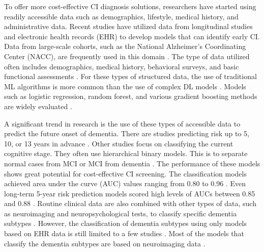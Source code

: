 To offer more cost-effective CI diagnosis solutions, researchers have started using readily accessible data such as demographics, lifestyle, medical history, and administrative data. Recent studies have utilized data from longitudinal studies and electronic health records (\acrshort{EHR}) to develop models that can identify early CI. Data from large-scale cohorts, such as the National Alzheimer's Coordinating Center (\acrshort{NACC}), are frequently used in this domain \cite{abbas2024Explainable, Ren2023Improving}. The type of data utilized often includes demographics, medical history, behavioral surveys, and basic functional assessments \cite{Ren2023Improving, Ren2025Identifying}. For these types of structured data, the use of traditional ML algorithms is more common than the use of complex DL models \cite{Zhu2020Machine}. Models such as logistic regression, random forest, and various gradient boosting methods are widely evaluated \cite{Akter2025Using, Cui2024Prediction, Georgiev2024Predicting}.

A significant trend in research is the use of these types of accessible data to predict the future onset of dementia. There are studies predicting risk up to 5, 10, or 13 years in advance \cite{Georgiev2024Predicting, Li2023Early}. Other studies focus on classifying the current cognitive stage. They often use hierarchical binary models. This is to separate normal cases from MCI or MCI from dementia \cite{Ren2023Improving, Yue2023Explainable}. The performance of these models shows great potential for cost-effective CI screening. The classification models achieved area under the curve (\acrshort{AUC}) values ranging from 0.80 to 0.96 \cite{Cui2024Prediction, Richter2025Cognitive}. Even long-term 5-year risk prediction models scored high levels of AUCs between 0.85 and 0.88 \cite{Georgiev2024Predicting, Li2023Early}. Routine clinical data are also combined with other types of data, such as neuroimaging and neuropsychological tests, to classify specific dementia subtypes \cite{Silvia2023Differential, Xue2024AI}. However, the classification of dementia subtypes using only models based on EHR data is still limited to a few studies \cite{Sharma2024Leveraging}. Most of the models that classify the dementia subtypes are based on neuroimaging data \cite{Borchert2023Artificial}.


